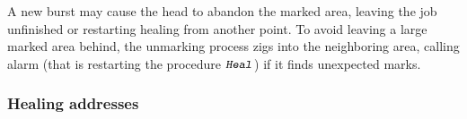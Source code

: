 \documentclass[12pt]{memoir}
\newcommand{\rul}[1]{\ensuremath{\texttt{\slshape #1\/}}}
\newcommand{\E}{E}
\newcommand{\R}{R}
\newcommand{\rHeal}{\rul{Heal}}
\begin{document}
A new burst may cause the head to abandon the marked area, leaving
the job unfinished or restarting healing from another point.
To avoid leaving a large marked area behind, the unmarking process zigs
into the neighboring area, calling alarm (that is restarting the procedure \( \rHeal \))
if it finds unexpected marks.




\subsubsection{Healing addresses}\label{sec:rec-addr}
\end{document}
